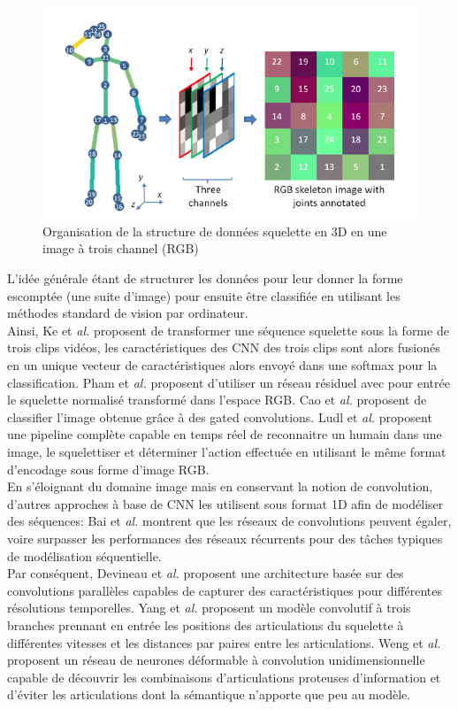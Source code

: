 \begin{figure}[H]
    \centering
    \includegraphics[width=0.7\linewidth]{Images/skeltoim.png}
    \caption{Organisation de la structure de données squelette en 3D en une image à trois channel (RGB)}
    \label{fig:skeltoim}
\end{figure}
L’idée générale étant de structurer les données pour leur donner la forme escomptée (une suite d’image) pour ensuite être classifiée en utilisant les méthodes standard de vision par ordinateur.\\


Ainsi, Ke et\textit{ al.} \cite{ke2017new} proposent de transformer une séquence squelette sous la forme de trois clips vidéos, les caractéristiques des CNN des trois clips sont alors fusionés en un unique vecteur de caractéristiques alors envoyé dans une softmax pour la classification.
Pham et\textit{ al.} \cite{pham2018learning} proposent d'utiliser un réseau résiduel \cite{he2016deep} avec pour entrée le squelette normalisé transformé dans l'espace RGB.
Cao et\textit{ al.}\cite{cao2018skeleton} proposent de classifier l'image obtenue grâce à des gated convolutions.
Ludl et\textit{ al.} \cite{ludl2019simple} proposent une pipeline complète capable en temps réel de reconnaitre un humain dans une image, le squelettiser et déterminer l'action effectuée en utilisant le même format d'encodage sous forme d'image RGB.\\

En s'éloignant du domaine image mais en conservant la notion de convolution, d'autres approches à base de CNN les utilisent sous format 1D afin de modéliser des séquences:
Bai et\textit{ al.} \cite{bai2018empirical} montrent que les réseaux de convolutions peuvent égaler, voire surpasser les performances des réseaux récurrents pour des tâches typiques de modélisation séquentielle.\\

Par conséquent, Devineau et\textit{ al.} \cite{devineau2018deep} proposent une architecture basée sur des convolutions parallèles capables de capturer des caractéristiques pour différentes résolutions temporelles.
Yang et\textit{ al.} \cite{2019arXiv190709658Y} proposent un modèle convolutif à trois branches prennant en entrée les positions des articulations du squelette à différentes vitesses et les distances par paires entre les articulations.
Weng et\textit{ al.} \cite{weng2018deformable} proposent un réseau de neurones déformable à convolution unidimensionnelle capable de découvrir les combinaisons d'articulations proteuses d'information et d'éviter les articulations dont la sémantique n'apporte que peu au modèle.



